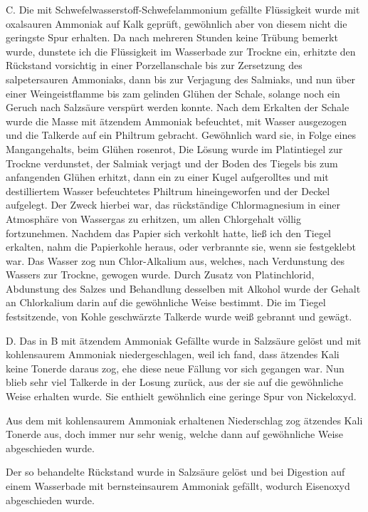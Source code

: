 \documentclass[a4paper, 11pt, oneside]{article}
\begin{document}
C. Die mit Schwefelwasserstoff-Schwefelammonium gefällte Flüssigkeit wurde mit oxalsauren Ammoniak auf Kalk geprüft, gewöhnlich aber von diesem nicht die geringste Spur erhalten. Da nach mehreren Stunden keine Trübung bemerkt wurde, dunstete ich die Flüssigkeit im Wasserbade zur Trockne ein, erhitzte den Rückstand vorsichtig in einer Porzellanschale bis zur Zersetzung des salpetersauren Ammoniaks, dann bis zur Verjagung des Salmiaks, und nun über einer Weingeistflamme bis zam gelinden Glühen der Schale, solange noch ein Geruch nach Salzsäure verspürt werden konnte. Nach dem Erkalten der Schale wurde die Masse mit ätzendem Ammoniak befeuchtet, mit Wasser ausgezogen und die Talkerde auf ein Philtrum gebracht. Gewöhnlich ward sie, in Folge eines Mangangehalts, beim Glühen rosenrot, Die Lösung wurde im Platintiegel zur Trockne verdunstet, der Salmiak verjagt und der Boden des Tiegels bis zum anfangenden Glühen erhitzt, dann ein zu einer Kugel aufgerolltes und mit destilliertem Wasser befeuchtetes Philtrum hineingeworfen und der Deckel aufgelegt. Der Zweck hierbei war, das rückständige Chlormagnesium in einer Atmosphäre von Wassergas zu erhitzen, um allen Chlorgehalt völlig fortzunehmen. Nachdem das Papier sich verkohlt hatte, ließ ich den Tiegel erkalten, nahm die Papierkohle heraus, oder verbrannte sie, wenn sie festgeklebt war. Das Wasser zog nun Chlor-Alkalium aus, welches, nach Verdunstung des Wassers zur Trockne, gewogen wurde. Durch Zusatz von Platinchlorid, Abdunstung des Salzes und Behandlung desselben mit Alkohol wurde der Gehalt an Chlorkalium darin auf die gewöhnliche Weise bestimmt. Die im Tiegel festsitzende, von Kohle geschwärzte Talkerde wurde weiß gebrannt und gewägt.

D. Das in B mit ätzendem Ammoniak Gefällte wurde in Salzsäure gelöst und mit kohlensaurem Ammoniak niedergeschlagen, weil ich fand, dass ätzendes Kali keine Tonerde daraus zog, ehe diese neue Fällung vor sich gegangen war. Nun blieb sehr viel Talkerde in der Losung zurück, aus der sie auf die gewöhnliche Weise erhalten wurde. Sie enthielt gewöhnlich eine geringe Spur von Nickeloxyd.

Aus dem mit kohlensaurem Ammoniak erhaltenen Niederschlag zog ätzendes Kali Tonerde aus, doch immer nur sehr wenig, welche dann auf gewöhnliche Weise abgeschieden wurde.

Der so behandelte Rückstand wurde in Salzsäure gelöst und bei Digestion auf einem Wasserbade mit bernsteinsaurem Ammoniak gefällt, wodurch Eisenoxyd abgeschieden wurde.
\end{document}
